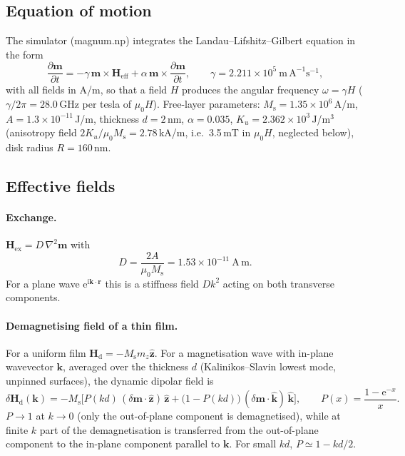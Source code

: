 \documentclass[11pt,a4paper]{article}
\newcommand{\vect}[1]{\mathbf{#1}}
\newcommand{\uv}[1]{\hat{\mathbf{#1}}}
\newcommand{\Ms}{M_\mathrm{s}}
\newcommand{\ee}{\mathrm{e}}
\newcommand{\ii}{\mathrm{i}}
\begin{document}
\subsection{Equation of motion}
The simulator (magnum.np) integrates the Landau--Lifshitz--Gilbert equation in the form
\begin{equation}
\frac{\partial\vect m}{\partial t}=-\gamma\,\vect m\times\vect H_\mathrm{eff}
+\alpha\,\vect m\times\frac{\partial\vect m}{\partial t},
\qquad \gamma=2.211\times10^{5}\ \mathrm{m\,A^{-1}s^{-1}},
\label{eq:llg}
\end{equation}
with all fields in A/m, so that a field $H$ produces the angular frequency $\omega=\gamma H$
($\gamma/2\pi=28.0$\,GHz per tesla of $\mu_0H$).  Free-layer parameters:
$\Ms=1.35\times10^{6}$\,A/m, $A=1.3\times10^{-11}$\,J/m, thickness $d=2$\,nm, $\alpha=0.035$,
$K_u=2.362\times10^{3}$\,J/m$^3$ (anisotropy field $2K_u/\mu_0\Ms=2.78$\,kA/m, i.e.\ 3.5\,mT in $\mu_0H$, neglected below), disk radius $R=160$\,nm.

\subsection{Effective fields}

\paragraph{Exchange.}
$\vect H_\mathrm{ex}=D\,\nabla^2\vect m$ with
\begin{equation}
D=\frac{2A}{\mu_0\Ms}=1.53\times10^{-11}\ \mathrm{A\,m}.
\end{equation}
For a plane wave $\ee^{\ii\vect k\cdot\vect r}$ this is a stiffness field $Dk^2$ acting on both transverse
components.

\paragraph{Demagnetising field of a thin film.}
For a uniform film $\vect H_\mathrm{d}=-\Ms m_z\uv z$.  For a magnetisation wave with in-plane wavevector
$\vect k$, averaged over the thickness $d$ (Kalinikos--Slavin lowest mode, unpinned surfaces), the dynamic dipolar
field is
\begin{equation}
\delta\vect H_\mathrm{d}(\vect k)=-\Ms\Big[P(kd)\,(\delta\vect m\cdot\uv z)\,\uv z
+\big(1-P(kd)\big)\,(\delta\vect m\cdot\uv k)\,\uv k\Big],
\qquad P(x)=\frac{1-\ee^{-x}}{x}.
\label{eq:dip}
\end{equation}
$P\to1$ at $k\to0$ (only the out-of-plane component is demagnetised), while at finite $k$ part of the
demagnetisation is transferred from the out-of-plane component to the in-plane component parallel to $\vect k$.
For small $kd$, $P\simeq1-kd/2$.
\end{document}
